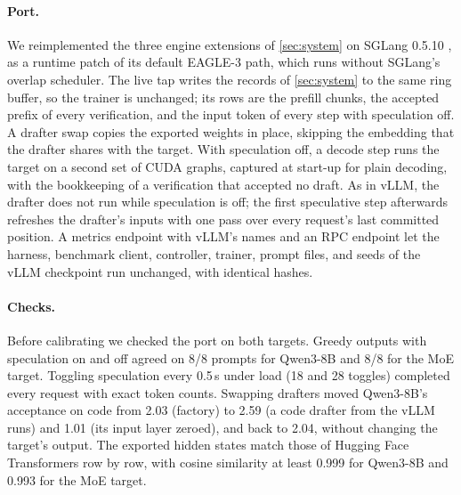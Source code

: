 \documentclass{article}
\begin{document}
\paragraph{Port.} We reimplemented the three engine extensions of \cref{sec:system} on SGLang 0.5.10 \citep{zheng2024sglang}, as a runtime patch of its default EAGLE-3 path, which runs without SGLang's overlap scheduler. The live tap writes the records of \cref{sec:system} to the same ring buffer, so the trainer is unchanged; its rows are the prefill chunks, the accepted prefix of every verification, and the input token of every step with speculation off. A drafter swap copies the exported weights in place, skipping the embedding that the drafter shares with the target. With speculation off, a decode step runs the target on a second set of CUDA graphs, captured at start-up for plain decoding, with the bookkeeping of a verification that accepted no draft. As in vLLM, the drafter does not run while speculation is off; the first speculative step afterwards refreshes the drafter's inputs with one pass over every request's last committed position. A metrics endpoint with vLLM's names and an RPC endpoint let the harness, benchmark client, controller, trainer, prompt files, and seeds of the vLLM checkpoint run unchanged, with identical hashes.

\paragraph{Checks.} Before calibrating we checked the port on both targets. Greedy outputs with speculation on and off agreed on 8/8 prompts for Qwen3-8B and 8/8 for the MoE target. Toggling speculation every 0.5\,s under load (18 and 28 toggles) completed every request with exact token counts. Swapping drafters moved Qwen3-8B's acceptance on code from 2.03 (factory) to 2.59 (a code drafter from the vLLM runs) and 1.01 (its input layer zeroed), and back to 2.04, without changing the target's output. The exported hidden states match those of Hugging Face Transformers row by row, with cosine similarity at least 0.999 for Qwen3-8B and 0.993 for the MoE target.
\end{document}
